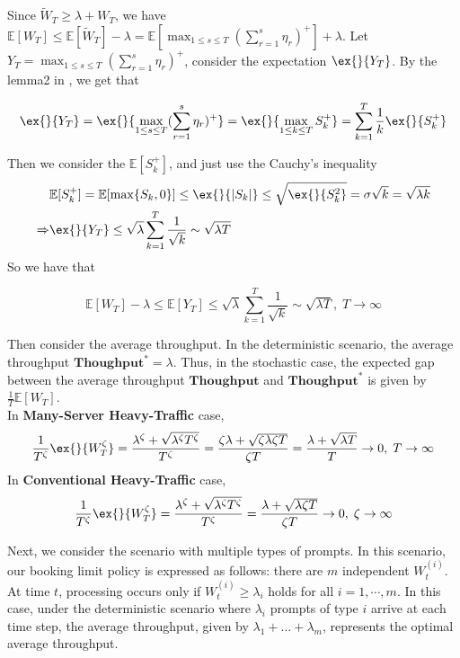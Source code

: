\documentclass[opre, nonblindrev]{informs3} %
\newcommand{\throughput}{\textbf{Thoughput}}
\begin{document}
Since $\tilde{W}_T \geq \lambda+W_T$, we have $\mathbb{E}[W_T]\leq \mathbb{E}[\tilde{W}_T]-\lambda = \mathbb{E}[\max_{1\leq s\leq T}(\sum_{r=1}^{s}\eta_r)^+]+\lambda$. Let $Y_T = \max_{1\leq s\leq T}(\sum_{r=1}^{s}\eta_r)^+$, consider the expectation $\ex{}{Y_T}$.
By the lemma2 in \cite{strait1974maximum}, we get that
\begin{lemma}
    $$\ex{}{Y_T}=\ex{}{\max_{1\leq s\leq T}(\sum_{r=1}^s\eta_r)^+}=\ex{}{\max_{1\leq k\leq T}S_k^+}=\sum_{k=1}^T \frac{1}{k}\ex{}{S_k^+}$$
\end{lemma}
Then we consider the $\mathbb{E}[S_k^+]$, and just use the Cauchy's inequality
\begin{align*}
&\mathbb{E}[S_k^+]=\mathbb{E}[\max\{S_k,0\}]\leq \ex{}{|S_k|}\leq \sqrt{\ex{}{S_k^2}}=\sigma\sqrt{k}=\sqrt{\lambda k}\\
\Rightarrow& \ex{}{Y_T}\leq \sqrt{\lambda}\sum_{k=1}^T \frac{1}{\sqrt{k}} \sim \sqrt{\lambda T}
\end{align*}
So we have that 
\begin{lemma}\label{lemma::throughput gap}
    $$\mathbb{E}[W_T]-\lambda\leq \mathbb{E}[Y_T]\leq  \sqrt{\lambda} \sum_{k=1}^T \frac{1}{\sqrt{k}} \sim\sqrt{\lambda T},\; T\to \infty$$
\end{lemma}
Then consider the average throughput. In the deterministic scenario, the average throughput $\throughput^* = \lambda$. Thus, in the stochastic case, the expected gap between the average throughput $\throughput$ and $\throughput^*$ is given by $\frac{1}{T}\mathbb{E}[W_T]$.\\
In \textbf{Many-Server Heavy-Traffic} case, 
\begin{align*}
    \frac{1}{T^{\zeta}}\ex{}{W_T^{\zeta}}=\frac{\lambda^{\zeta}+\sqrt{\lambda^{\zeta}T^{\zeta}}}{T^{\zeta}}=\frac{\zeta\lambda+\sqrt{\zeta\lambda \zeta T }}{\zeta T}=\frac{\lambda+\sqrt{\lambda T}}{T}\to 0,\; T\to \infty
\end{align*}
In \textbf{Conventional Heavy-Traffic} case, 
\begin{align*}
    \frac{1}{T^{\zeta}}\ex{}{W_T^{\zeta}}=\frac{\lambda^{\zeta}+\sqrt{\lambda^{\zeta}T^{\zeta}}}{T^{\zeta}}=\frac{\lambda+\sqrt{\lambda \zeta T }}{\zeta T}\to 0,\; \zeta\to \infty 
\end{align*}

Next, we consider the scenario with multiple types of prompts. In this scenario, our booking limit policy is expressed as follows: there are $m$ independent $W_t^{(i)}$. At time $t$, processing occurs only if $W_t^{(i)} \geq \lambda_i$ holds for all $i=1,\cdots,m$. In this case, under the deterministic scenario where $\lambda_i$ prompts of type $i$ arrive at each time step, the average throughput, given by $\lambda_1 + \dots + \lambda_m$, represents the optimal average throughput.
\end{document}
